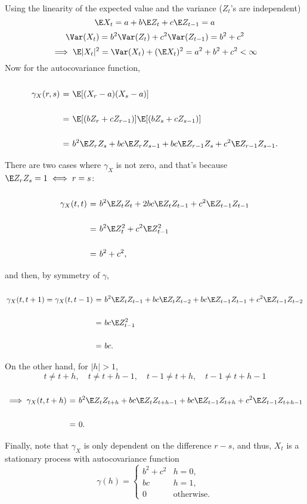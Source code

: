 Using the linearity of the expected value and the variance ($Z_t$'s are independent)
\[ \E X_t = a + b\E Z_t + c \E Z_{t-1} = a \]
\[ \Var(X_t) = b^2 \Var(Z_t) + c^2 \Var(Z_{t-1}) = b^2+c^2 \]
\[ \implies \E|X_t|^2 = \Var(X_t) + (\E X_t)^2 = a^2 + b^2 + c^2 <\infty \]
Now for the autocovariance function,
\[ \everymath{\displaystyle}
\arraycolsep=1.8pt\def\arraystretch{2.5}
\begin{array}{rcl}
    \gamma_X(r,s) & = & \E[(X_r-a)(X_s-a)]\\
    & = & \E[(bZ_r + cZ_{r-1})] \E[(bZ_s + cZ_{s-1})]\\
    & = & b^2 \E Z_r Z_s + bc \E Z_r Z_{s-1} + bc \E Z_{r-1} Z_s + c^2 \E Z_{r-1}Z_{s-1}.
\end{array} \]
There are two cases where $\gamma_{X}$ is not zero, and that's because $\E Z_r Z_s = 1 \iff r = s$:
\[ \everymath{\displaystyle}
\arraycolsep=1.8pt\def\arraystretch{2.5}
\begin{array}{rcl}
    \gamma_X(t,t) & = & b^2 \E Z_t Z_t + 2bc \E Z_t Z_{t-1} + c^2 \E Z_{t-1}Z_{t-1} \\
    & = & b^2 \E Z_t^2 + c^2 \E Z_{t-1}^2\\
    & = & b^2 + c^2,
\end{array}  \]
and then, by symmetry of $\gamma$,
\[ \everymath{\displaystyle}
\arraycolsep=1.8pt\def\arraystretch{2.5}
\begin{array}{rcl}
    \gamma_X(t,t+1) = \gamma_X(t,t-1) & = & b^2 \E Z_t Z_{t-1} + bc \E Z_t Z_{t-2} + bc \E Z_{t-1} Z_{t-1} + c^2 \E Z_{t-1}Z_{t-2}\\
    & = & bc \E Z_{t-1}^2\\
    & = & bc.
\end{array}\]
On the other hand, for $|h| > 1$,
\[ t \neq t+h,\hspace{1em}  t \neq t+h-1,\hspace{1em} t-1 \neq t+h,\hspace{1em} t-1 \neq t+h-1  \]
\[ \everymath{\displaystyle}
\arraycolsep=1.8pt\def\arraystretch{2.5}
\begin{array}{rcl}
    \implies \gamma_X(t,t+h) & = & b^2 \E Z_t Z_{t+h} + bc \E Z_t Z_{t+h-1} + bc \E Z_{t-1} Z_{t+h} + c^2 \E Z_{t-1}Z_{t+h-1}\\
    & = & 0.
\end{array}\]
Finally, note that $\gamma_X$ is only dependent on the difference $r-s$, and thus, $X_t$ is a stationary process with autocovariance function
\[ \gamma(h) = \begin{cases}
    b^2+c^2& h = 0,\\
    bc & h = 1,\\
    0 & \mbox{otherwise.}
\end{cases} \]


